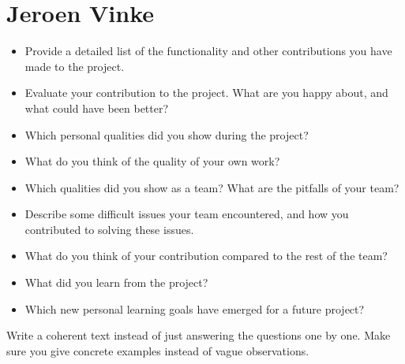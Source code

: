 \section{Jeroen Vinke}
\begin{itemize}
    \item Provide a detailed list of the functionality and other 
    contributions you have made to the project.
    \item Evaluate your contribution to the project. What are you happy 
    about, and what could have been better?
    \item Which personal qualities did you show during the project?
    \item What do you think of the quality of your own work?
    \item Which qualities did you show as a team? What are the pitfalls of your team?
    \item Describe some difficult issues your team encountered, and how you 
    contributed to solving these issues.
    \item What do you think of your contribution compared to the rest of 
    the team?
    \item What did you learn from the project?
    \item Which new personal learning goals have emerged for a future project?
\end{itemize}

Write  a  coherent  text  instead  of  just  answering  the  questions  one  by  one.   Make
sure you give concrete examples instead of vague observations.
